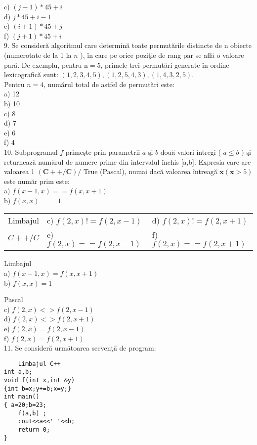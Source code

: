c) $(j-1) * 45+i$\\
d) $j * 45+i-1$\\
e) $(i+1) * 45+j$\\
f) $(j+1) * 45+i$\\
9. Se consideră algoritmul care determină toate permutările distincte de n obiecte (numerotate de la 1 la $n$ ), în care pe orice poziţie de rang par se află o valoare pară. De exemplu, pentru $\mathrm{n}=5$, primele trei permutări generate în ordine lexicografică sunt: $(1,2,3,4,5),(1,2,5,4,3),(1,4,3,2,5)$.\\
Pentru $n=4$, numărul total de astfel de permutări este:\\
a) 12\\
b) 10\\
c) 8\\
d) 7\\
e) 6\\
f) 4\\
10. Subprogramul $f$ primeşte prin parametrii $a$ şi $b$ două valori întregi ( $a \leq b$ ) şi returnează numărul de numere prime din intervalul închis [a,b]. Expresia care are valoarea 1 $(\mathbf{C}++/ \mathbf{C}) /$ True (Pascal), numai dacă valoarea întreagă $\mathbf{x}(\mathbf{x}>5)$ este număr prim este:\\
a) $f(x-1, x)==f(x, x+1)$\\
b) $f(x, x)==1$

\begin{center}
\begin{tabular}{lll}
Limbajul & c) $f(2, x)!=f(2, x-1)$ & d) $f(2, x)!=f(2, x+1)$ \\
$C++/ C$ & e) $f(2, x)==f(2, x-1)$ & f) $f(2, x)==f(2, x+1)$ \\
\end{tabular}
\end{center}

Limbajul\\
a) $f(x-1, x)=f(x, x+1)$\\
b) $f(x, x)=1$

Pascal\\
c) $f(2, x)<>f(2, x-1)$\\
d) $f(2, x)<>f(2, x+1)$\\
e) $f(2, x)=f(2, x-1)$\\
f) $f(2, x)=f(2, x+1)$\\
11. Se consideră următoarea secvenţă de program:

\begin{verbatim}
    Limbajul C++
int a,b;
void f(int x,int &y)
{int b=x;y+=b;x=y;}
int main()
{ a=20;b=23;
    f(a,b) ;
    cout<<a<<' '<<b;
    return 0;
}
\end{verbatim}


